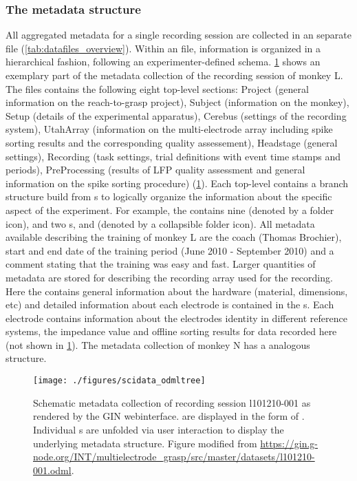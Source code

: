 \subsubsection{The metadata structure}
\label{sec:scidata_metadata_structure}
All aggregated metadata for a single recording session are collected in an separate  file (\ref{tab:datafiles_overview}). Within an  file, information is organized in a hierarchical fashion, following an experimenter-defined schema. \cref{fig:scidata_l101210odml} shows an exemplary part of the metadata collection of the recording session of monkey L. The  files contains the following eight top-level sections: Project (general information on the reach-to-grasp project), Subject (information on the monkey), Setup (details of the experimental apparatus), Cerebus (settings of the recording system), UtahArray (information on the multi-electrode array including spike sorting results and the corresponding quality assessement), Headstage (general settings), Recording (task settings, trial definitions with event time stamps and periods), PreProcessing (results of LFP quality assessment and general information on the spike sorting procedure) (\cref{fig:scidata_l101210odml}). Each top-level  contains a branch structure build from s to logically organize the information about the specific aspect of the experiment. For example, the   contains nine  (denoted by a folder icon), and two s,  and  (denoted by a collapsible folder icon). All metadata available describing the training of monkey L are the coach (Thomas Brochier), start and end date of the training period (June 2010 - September 2010) and a comment stating that the training was easy and fast. Larger quantities of metadata are stored for describing the recording array used for the recording. Here the   contains general information about the hardware (material, dimensions, etc) and detailed information about each electrode is contained in the  s. Each electrode  contains information about the electrodes identity in different reference systems, the impedance value and offline sorting results for data recorded here (not shown in \cref{fig:scidata_l101210odml}). The metadata collection of monkey N has a analogous structure.

\begin{figure}
 \texttt{[image: ./figures/scidata\_odmltree]}
 \caption[Schematic metadata collection of session l101210-001]{Schematic metadata collection of recording session l101210-001 as rendered by the GIN webinterface.  are displayed in the form of . Individual s are unfolded via user interaction to display the underlying metadata structure. Figure modified from \url{https://gin.g-node.org/INT/multielectrode_grasp/src/master/datasets/l101210-001.odml}.}
 \label{fig:scidata_l101210odml}
\end{figure}

